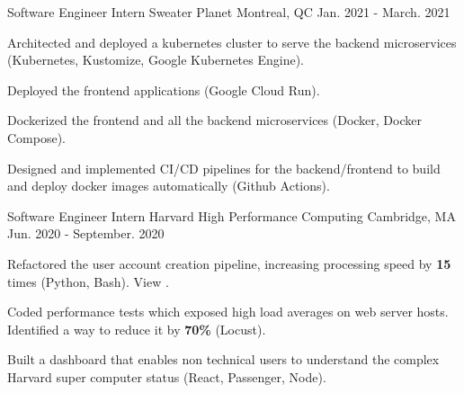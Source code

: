 \begin{cventries}
  \cventry
    {Software Engineer Intern} %
    {Sweater Planet} %
    {Montreal, QC} %
    {Jan. 2021 - March. 2021} %
    {
      \begin{cvitems} %
      \item{Architected and deployed a kubernetes cluster to serve the backend microservices (Kubernetes, Kustomize, Google Kubernetes Engine).} 
      \item{Deployed the frontend applications (Google Cloud Run).}
      \item{Dockerized the frontend and all the backend microservices (Docker, Docker Compose).}
      \item{Designed and implemented CI/CD pipelines for the backend/frontend to build and deploy docker images automatically (Github Actions).}
      \end{cvitems}
    }


  \cventry
    {Software Engineer Intern} %
    {Harvard High Performance Computing} %
    {Cambridge, MA} %
    {Jun. 2020 - September. 2020} %
    {
      \begin{cvitems} %
      \item {Refactored the user account creation pipeline, increasing processing speed by \textbf{15} times (Python, Bash). View .} 
      \item {Coded performance tests which exposed high load averages on web server hosts. Identified a way to reduce it by \textbf{70\%} (Locust).}
      \item {Built a dashboard that enables non technical users to understand the complex Harvard super computer status (React, Passenger, Node).}
      \end{cvitems}
    }


\end{cventries}

